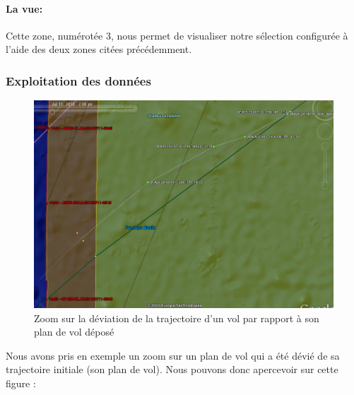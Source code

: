             \paragraph{La vue:}
Cette zone, numérotée 3, nous permet de visualiser notre sélection configurée à l'aide des deux zones citées précédemment.

        \subsubsection{Exploitation des données}
\begin{figure}[!h]
\center
\includegraphics[width=12cm]{images/gezoom.png}
\caption{Zoom sur la déviation de la trajectoire d'un vol par rapport à son plan de vol déposé}
\label{gezoom}
\end{figure}
Nous avons pris en exemple un zoom sur un plan de vol qui a été dévié de sa trajectoire initiale (son plan de vol).
Nous pouvons donc apercevoir sur cette figure :
